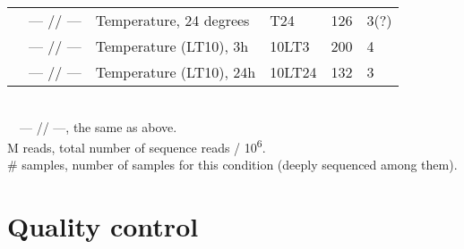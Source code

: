 \documentclass[12pt]{article}
\begin{document}
\begin{table}[H]
\begin{tabular}{lllll}
~~--- // --- & Temperature, 24 degrees & T24 & 126 & 3(?) \\
~~--- // --- & Temperature (LT10), 3h & 10LT3 & 200 & 4 \\
~~--- // --- & Temperature (LT10), 24h & 10LT24 & 132 & 3 \\ \hline
	\end{tabular} 
\endgroup
\smallskip \small \\
~~--- // ---, the same as above. \\
M reads, total number of sequence reads / 10\textsuperscript{6}. \\
\# samples, number of samples for this condition (deeply sequenced among them). 
\label{conditions}
	\end{table}

		
		
	

\section{Quality control}

		
		
		
\end{document}
